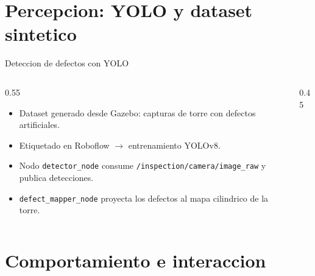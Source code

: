 \documentclass[10pt,aspectratio=169]{beamer}
\begin{document}
\section{Percepcion: YOLO y dataset sintetico}

\begin{frame}{Deteccion de defectos con YOLO}
  \begin{columns}
    \begin{column}{0.55\textwidth}
      \begin{itemize}
        \item Dataset  generado desde Gazebo: capturas de torre con defectos artificiales.
        \item Etiquetado en Roboflow $\to$ entrenamiento YOLOv8.
        \item Nodo \texttt{detector\_node} consume \texttt{/inspection/camera/image\_raw} y publica detecciones.
        \item \texttt{defect\_mapper\_node} proyecta los defectos al mapa cilindrico de la torre.
      \end{itemize}
    \end{column}
    \begin{column}{0.45\textwidth}
    \end{column}
  \end{columns}
\end{frame}

\section{Comportamiento e interaccion}
\end{document}
